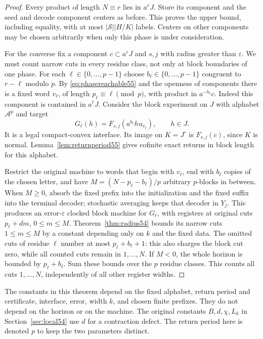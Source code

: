 \begin{proof}
Every product of length $N\equiv r$ lies in $a^rJ$. Store its component and the seed and decode component centers as before. This proves the upper bound, including equality, with at most $|\mathcal S||H/K|$ labels. Centers on other components may be chosen arbitrarily when only this phase is under consideration.

For the converse fix a component $c\subset a^rJ$ and $s,j$ with radius greater than $\varepsilon$. We must count narrow cuts in every residue class, not only at block boundaries of one phase. For each $\ell\in\{0,\ldots,p-1\}$ choose $b_\ell\in\{0,\ldots,p-1\}$ congruent to $r-\ell$ modulo $p$. By \eqref{eq:phasereachable55} and the openness of components there is a fixed word $v_\ell$, of length $p_\ell\equiv\ell\pmod p$, with product in $a^{-b_\ell}c$. Indeed this component is contained in $a^\ell J$. Consider the block experiment on $J$ with alphabet $\mathcal A^p$ and target
\[
        G_\ell(h)=F_{s,j}(a^{b_\ell}h u_{v_\ell}),\qquad h\in J.
\]
It is a legal compact-convex interface. Its image on $K=J^\circ$ is $F_{s,j}(c)$, since $K$ is normal. Lemma~\ref{lem:returnperiod55} gives cofinite exact returns in block length for this alphabet.

Restrict the original machine to words that begin with $v_\ell$, end with $b_\ell$ copies of the chosen letter, and have $M=(N-p_\ell-b_\ell)/p$ arbitrary $p$-blocks in between. When $M\ge0$, absorb the fixed prefix into the initialization and the fixed suffix into the terminal decoder; stochastic averaging keeps that decoder in $Y_j$. This produces an error-$\varepsilon$ clocked block machine for $G_\ell$, with registers at original cuts $p_\ell+dm$, $0\le m\le M$. Theorem~\ref{thm:radius54} bounds its narrow cuts $1\le m\le M$ by a constant depending only on $k$ and the fixed data. The omitted cuts of residue $\ell$ number at most $p_\ell+b_\ell+1$: this also charges the block cut zero, while all counted cuts remain in $1,\ldots,N$. If $M<0$, the whole horizon is bounded by $p_\ell+b_\ell$. Sum these bounds over the $p$ residue classes. This counts all cuts $1,\ldots,N$, independently of all other register widths.
\end{proof}
The constants in this theorem depend on the fixed alphabet, return period and certificate, interface, error, width $k$, and chosen finite prefixes. They do not depend on the horizon or on the machine. The original constants $B,d,\chi,L_k$ in Section~\ref{sec:local54} use $d$ for a contraction defect. The return period here is denoted $p$ to keep the two parameters distinct.

